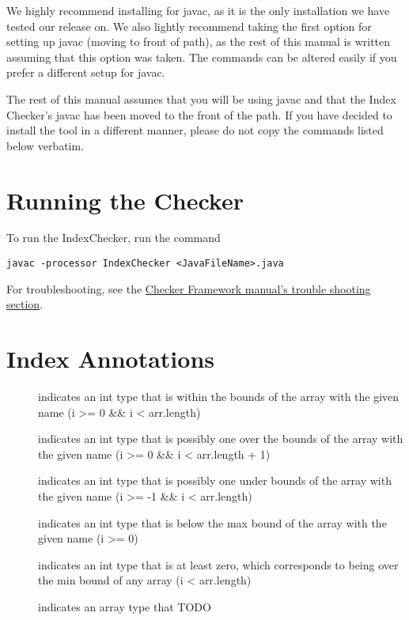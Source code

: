 We highly recommend installing for javac, as it is the only installation we
have tested our release on. We also lightly recommend taking the first option
for setting up javac (moving to front of path), as the rest of this manual
is written assuming that this option was taken. The commands can be altered
easily if you prefer a different setup for javac.

The rest of this manual assumes that you will be using javac and that the Index
Checker's javac has been moved to the front of the path. If you have decided to
install the tool in a different manner, please do not copy the commands listed
below verbatim.

\section{Running the Checker\label{index-running}}

To run the IndexChecker, run the command

\begin{Verbatim}
javac -processor IndexChecker <JavaFileName>.java
\end{Verbatim}

For troubleshooting, see the \href{http://types.cs.washington.edu/checker-framework/current/checker-framework-manual.html#troubleshooting}
{Checker Framework manual's trouble shooting section}.

\section{Index Annotations\label{index-annotations}}

\begin{description}
\item[]
	indicates an int type that is within the bounds of the array with the given
	name (i >= 0 \&\& i < arr.length)
\item[]
	indicates an int type that is possibly one over the bounds of the array with
	the given name (i >= 0 \&\& i < arr.length + 1)
\item[]
	indicates an int type that is possibly one under bounds of the array with the
	given name (i >= -1 \&\& i < arr.length)
\item[]
	indicates an int type that is below the max bound of the array with the given
	name (i >= 0)
\item[]
	indicates an int type that is at least zero, which corresponds to being over
	the min bound of any array (i < arr.length)
\item[]
	indicates an array type that TODO
\end{description}

